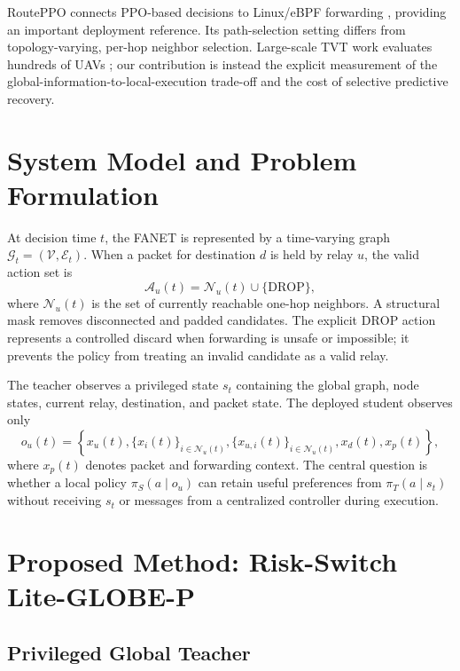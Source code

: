 \documentclass[drones,article,submit,moreauthors]{Definitions/mdpi}
\newcommand{\method}{Risk-Switch Lite-GLOBE-P}
\newcommand{\drop}{\mathrm{DROP}}
\begin{document}
RoutePPO connects PPO-based decisions to Linux/eBPF forwarding \cite{Curmen2026RoutePPO}, providing an important deployment reference. Its path-selection setting differs from topology-varying, per-hop neighbor selection. Large-scale TVT work evaluates hundreds of UAVs \cite{Zhang2026LargeScale}; our contribution is instead the explicit measurement of the global-information-to-local-execution trade-off and the cost of selective predictive recovery.

\section{System Model and Problem Formulation}

At decision time $t$, the FANET is represented by a time-varying graph $\mathcal{G}_t=(\mathcal{V},\mathcal{E}_t)$. When a packet for destination $d$ is held by relay $u$, the valid action set is
\begin{equation}
    \mathcal{A}_u(t)=\mathcal{N}_u(t)\cup\{\drop\},
    \label{eq:action}
\end{equation}
where $\mathcal{N}_u(t)$ is the set of currently reachable one-hop neighbors. A structural mask removes disconnected and padded candidates. The explicit $\drop$ action represents a controlled discard when forwarding is unsafe or impossible; it prevents the policy from treating an invalid candidate as a valid relay.

The teacher observes a privileged state $s_t$ containing the global graph, node states, current relay, destination, and packet state. The deployed student observes only
\begin{equation}
o_u(t)=\left\{x_u(t),\{x_i(t)\}_{i\in\mathcal{N}_u(t)},
\{x_{u,i}(t)\}_{i\in\mathcal{N}_u(t)},x_d(t),x_p(t)\right\},
\label{eq:local-observation}
\end{equation}
where $x_p(t)$ denotes packet and forwarding context. The central question is whether a local policy $\pi_S(a\mid o_u)$ can retain useful preferences from $\pi_T(a\mid s_t)$ without receiving $s_t$ or messages from a centralized controller during execution.

\section{Proposed Method: \method}

\subsection{Privileged Global Teacher}
\end{document}
